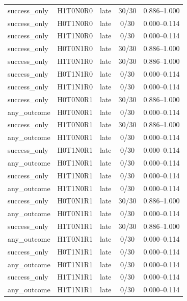 \begin{table}[t]
\begin{tabular}{lcccc}
success\_only & H1T0N0R0 & late & 30/30 & 0.886–1.000 \\
success\_only & H0T1N0R0 & late & 0/30 & 0.000–0.114 \\
success\_only & H1T1N0R0 & late & 0/30 & 0.000–0.114 \\
success\_only & H0T0N1R0 & late & 30/30 & 0.886–1.000 \\
success\_only & H1T0N1R0 & late & 30/30 & 0.886–1.000 \\
success\_only & H0T1N1R0 & late & 0/30 & 0.000–0.114 \\
success\_only & H1T1N1R0 & late & 0/30 & 0.000–0.114 \\
success\_only & H0T0N0R1 & late & 30/30 & 0.886–1.000 \\
any\_outcome & H0T0N0R1 & late & 0/30 & 0.000–0.114 \\
success\_only & H1T0N0R1 & late & 30/30 & 0.886–1.000 \\
any\_outcome & H1T0N0R1 & late & 0/30 & 0.000–0.114 \\
success\_only & H0T1N0R1 & late & 0/30 & 0.000–0.114 \\
any\_outcome & H0T1N0R1 & late & 0/30 & 0.000–0.114 \\
success\_only & H1T1N0R1 & late & 0/30 & 0.000–0.114 \\
any\_outcome & H1T1N0R1 & late & 0/30 & 0.000–0.114 \\
success\_only & H0T0N1R1 & late & 30/30 & 0.886–1.000 \\
any\_outcome & H0T0N1R1 & late & 0/30 & 0.000–0.114 \\
success\_only & H1T0N1R1 & late & 30/30 & 0.886–1.000 \\
any\_outcome & H1T0N1R1 & late & 0/30 & 0.000–0.114 \\
success\_only & H0T1N1R1 & late & 0/30 & 0.000–0.114 \\
any\_outcome & H0T1N1R1 & late & 0/30 & 0.000–0.114 \\
success\_only & H1T1N1R1 & late & 0/30 & 0.000–0.114 \\
any\_outcome & H1T1N1R1 & late & 0/30 & 0.000–0.114 \\
\bottomrule
\end{tabular}
\end{table}
